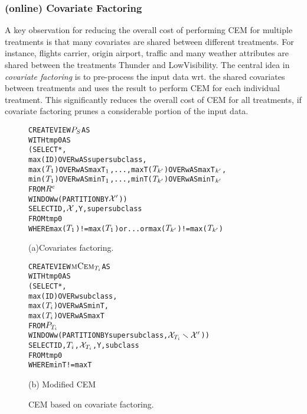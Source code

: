 \vspace{-.2cm}

\subsubsection{(online) Covariate Factoring}

A key observation for reducing the overall cost of performing CEM for multiple treatments is that
many covariates are shared between different treatments. For instance, flights carrier, origin airport, traffic and many weather attributes are shared between the treatments Thunder and LowVisibility. The central idea in {\em covariate factoring}  is to pre-process the input data
wrt.  the shared covariates between treatments and uses the result to perform CEM
for each individual treatment. This  significantly reduces the overall cost of CEM for all treatments,
if covariate factoring prunes a considerable portion of the input data.


\begin{figure}
\begin{alltt} \scriptsize
CREATE VIEW \(\prp\) AS
WITH tmp0 AS
  (SELECT *,
          max(ID) OVER w AS supersubclass,
          max(\(T\sb1\)) OVER w AS maxT\(\sb1\),..., maxT(\(T\sb{k'}\)) OVER w AS maxT\(\sb{k'}\),
          min(\(T\sb1\)) OVER w AS minT\(\sb1\),..., minT(\(T\sb{k'}\)) OVER w AS minT\(\sb{k'}\)
   FROM \(\rele\)
   WINDOW w (PARTITION BY \(\ccvin\)))
SELECT ID, \(\ccvu\), Y , supersubclass
FROM tmp0
WHERE max(\(T\sb1\))!=max(\(T\sb{1}\)) or ... or  max(\(T\sb{k'}\))!=max(\(T\sb{k'}\))
\end{alltt} \vspace{-.2cm} \hspace{2.5cm}
(a)Covariates factoring.
\vspace{-.1cm}
\begin{alltt} \scriptsize
CREATE VIEW \(\mcem\) AS
WITH tmp0 AS
  (SELECT *,
          max(ID) OVER w    subclass,
          max(\(T\sb{i}\))  OVER w AS minT,
          max(\(T\sb{i}\))  OVER w AS maxT
   FROM \(\prpi\)
   WINDOW w (PARTITION BY supersubclass, \( \ccv\sb{T\sb{i}} \smallsetminus \ccvin  \)))
SELECT ID,\(T\sb{i}\),\(\ccv\sb{T\sb{i}}\), Y, subclass
FROM tmp0
WHERE minT!=maxT
\end{alltt}
\vspace{-.2cm} \hspace{3cm}
(b) Modified CEM
\caption{CEM based on covariate factoring.}\label{fig:cf}
\end{figure}


